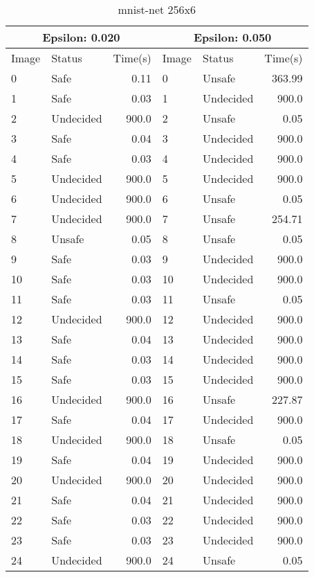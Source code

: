 \begin{table}[!ht]
  \centering
  \caption{mnist-net 256x6}
  \footnotesize
  \begin{tabular}{|llr|llr|}
    \toprule
    \multicolumn{3}{|c|}{Epsilon: 0.020} & \multicolumn{3}{|c|}{Epsilon: 0.050} \\
    \midrule
    Image & Status & Time(s) &Image & Status & Time(s)\\ 
    \midrule
    0 & Safe & 0.11 &    0 & Unsafe & 363.99\\ 
    1 & Safe & 0.03 &    1 & Undecided & 900.0\\ 
    2 & Undecided & 900.0 &    2 & Unsafe & 0.05\\ 
    3 & Safe & 0.04 &    3 & Undecided & 900.0\\ 
    4 & Safe & 0.03 &    4 & Undecided & 900.0\\ 
    5 & Undecided & 900.0 &    5 & Undecided & 900.0\\ 
    6 & Undecided & 900.0 &    6 & Unsafe & 0.05\\ 
    7 & Undecided & 900.0 &    7 & Unsafe & 254.71\\ 
    8 & Unsafe & 0.05 &    8 & Unsafe & 0.05\\ 
    9 & Safe & 0.03 &    9 & Undecided & 900.0\\ 
    10 & Safe & 0.03 &    10 & Undecided & 900.0\\ 
    11 & Safe & 0.03 &    11 & Unsafe & 0.05\\ 
    12 & Undecided & 900.0 &    12 & Undecided & 900.0\\ 
    13 & Safe & 0.04 &    13 & Undecided & 900.0\\ 
    14 & Safe & 0.03 &    14 & Undecided & 900.0\\ 
    15 & Safe & 0.03 &    15 & Undecided & 900.0\\ 
    16 & Undecided & 900.0 &    16 & Unsafe & 227.87\\ 
    17 & Safe & 0.04 &    17 & Undecided & 900.0\\ 
    18 & Undecided & 900.0 &    18 & Unsafe & 0.05\\ 
    19 & Safe & 0.04 &    19 & Undecided & 900.0\\ 
    20 & Undecided & 900.0 &    20 & Undecided & 900.0\\ 
    21 & Safe & 0.04 &    21 & Undecided & 900.0\\ 
    22 & Safe & 0.03 &    22 & Undecided & 900.0\\ 
    23 & Safe & 0.03 &    23 & Undecided & 900.0\\ 
    24 & Undecided & 900.0 &    24 & Unsafe & 0.05\\ 
    \bottomrule
  \end{tabular}
\end{table}

